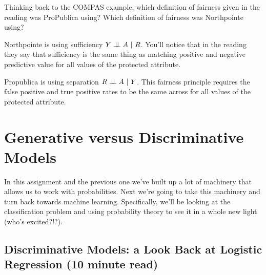 \documentclass[assignment03_Solutions]{subfiles}
\begin{document}
\begin{exercise}[(10 minutes)]
Thinking back to the COMPAS example, which definition of fairness given in the reading was ProPublica using?  Which definition of fairness was Northpointe using?

\begin{boxedsolution}
\bi
\item Northpointe is using sufficiency $Y \perp\!\!\!\perp A~|~R$.  You'll notice that in the reading they say that sufficiency is the same thing as matching positive and negative predictive value for all values of the protected attribute.
\item Propublica is using separation $R \perp\!\!\!\perp A~|~Y$.  This fairness principle requires the false positive and true positive rates to be the same across for all values of the protected attribute.
\ei
\end{boxedsolution}
\end{exercise}



\section{Generative versus Discriminative Models}
In this assignment and the previous one we've built up a lot of machinery that allows us to work with probabilities.  Next we're going to take this machinery and turn back towards machine learning.  Specifically, we'll be looking at the classification problem and using probability theory to see it in a whole new light (who's excited?!?).


\subsection{Discriminative Models: a Look Back at Logistic Regression (10 minute read)}
\end{document}
